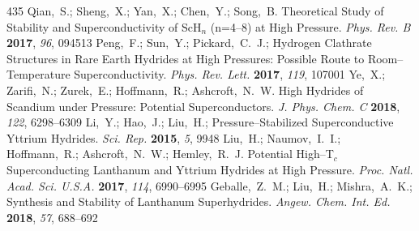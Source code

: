 \documentclass[12pt,letterpaper,oneside]{article}
\begin{document}
\begin{mcitethebibliography}{435}
\EndOfBibitem
{}
Qian,~S.; Sheng,~X.; Yan,~X.; Chen,~Y.; Song,~B. Theoretical Study of Stability
  and Superconductivity of ScH$_n$ (n=4--8) at High Pressure. \emph{Phys. Rev.
  B} \textbf{2017}, \emph{96}, 094513\relax
\mciteBstWouldAddEndPuncttrue
\mciteSetBstMidEndSepPunct{\mcitedefaultmidpunct}
{\mcitedefaultendpunct}{\mcitedefaultseppunct}\relax
\EndOfBibitem
{}
Peng,~F.; Sun,~Y.; Pickard,~C.~J.; 
  Hydrogen Clathrate Structures in Rare Earth Hydrides at High Pressures:
  Possible Route to Room--Temperature Superconductivity. \emph{Phys. Rev.
  Lett.} \textbf{2017}, \emph{119}, 107001\relax
\mciteBstWouldAddEndPuncttrue
\mciteSetBstMidEndSepPunct{\mcitedefaultmidpunct}
{\mcitedefaultendpunct}{\mcitedefaultseppunct}\relax
\EndOfBibitem
{}
Ye,~X.; Zarifi,~N.; Zurek,~E.; Hoffmann,~R.; Ashcroft,~N.~W. High Hydrides of
  Scandium under Pressure: Potential Superconductors. \emph{J. Phys. Chem. C}
  \textbf{2018}, \emph{122}, 6298--6309\relax
\mciteBstWouldAddEndPuncttrue
\mciteSetBstMidEndSepPunct{\mcitedefaultmidpunct}
{\mcitedefaultendpunct}{\mcitedefaultseppunct}\relax
\EndOfBibitem
{}
Li,~Y.; Hao,~J.; Liu,~H.; 
  Pressure--Stabilized Superconductive Yttrium Hydrides. \emph{Sci. Rep.}
  \textbf{2015}, \emph{5}, 9948\relax
\mciteBstWouldAddEndPuncttrue
\mciteSetBstMidEndSepPunct{\mcitedefaultmidpunct}
{\mcitedefaultendpunct}{\mcitedefaultseppunct}\relax
\EndOfBibitem
{}
Liu,~H.; Naumov,~I.~I.; Hoffmann,~R.; Ashcroft,~N.~W.; Hemley,~R.~J. Potential
  High--T$_c$ Superconducting Lanthanum and Yttrium Hydrides at High Pressure.
  \emph{Proc. Natl. Acad. Sci. U.S.A.} \textbf{2017}, \emph{114},
  6990--6995\relax
\mciteBstWouldAddEndPuncttrue
\mciteSetBstMidEndSepPunct{\mcitedefaultmidpunct}
{\mcitedefaultendpunct}{\mcitedefaultseppunct}\relax
\EndOfBibitem
{}
Geballe,~Z.~M.; Liu,~H.; Mishra,~A.~K.;
    Synthesis and Stability of Lanthanum Superhydrides.
  \emph{Angew. Chem. Int. Ed.} \textbf{2018}, \emph{57}, 688--692\relax
\mciteBstWouldAddEndPuncttrue
\mciteSetBstMidEndSepPunct{\mcitedefaultmidpunct}

\end{mcitethebibliography}
\end{document}
